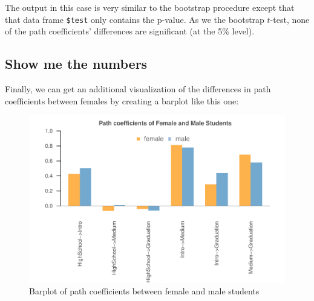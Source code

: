 \documentclass[12pt]{book}\usepackage{graphicx, color}
\newenvironment{knitrout}{}{} %
\newcommand{\code}[1]{\texttt{#1}}
\begin{document}
The output in this case is very similar to the bootstrap procedure except that that data frame \code{\$test} only contains the p-value. As we the bootstrap $t$-test, none of the path coefficients' differences are significant (at the 5\% level).


\subsection*{Show me the numbers}
Finally, we can get an additional visualization of the differences in path coefficients between females by creating a barplot like this one:
\begin{knitrout}
\color{fgcolor}\begin{figure}[h]


{\centering \includegraphics[width=.85\linewidth,height=.625\linewidth]{figure/female_male_barplot} 

}

\caption[Barplot of path coefficients between female and male students]{Barplot of path coefficients between female and male students\label{fig:female_male_barplot}}
\end{figure}


\end{knitrout}
\end{document}
